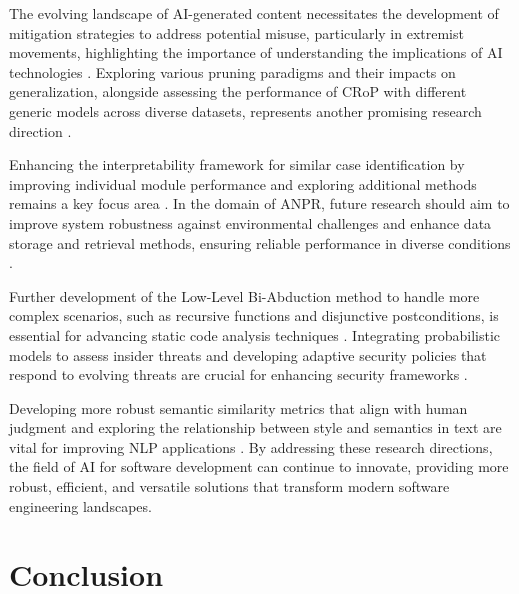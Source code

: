 The evolving landscape of AI-generated content necessitates the development of mitigation strategies to address potential misuse, particularly in extremist movements, highlighting the importance of understanding the implications of AI technologies \cite{mcguffie2020radicalizationrisksgpt3advanced}. Exploring various pruning paradigms and their impacts on generalization, alongside assessing the performance of CRoP with different generic models across diverse datasets, represents another promising research direction \cite{kaur2024cropcontextwiserobuststatic}.



Enhancing the interpretability framework for similar case identification by improving individual module performance and exploring additional methods remains a key focus area \cite{lin2023interpretabilityframeworksimilarcase}. In the domain of ANPR, future research should aim to improve system robustness against environmental challenges and enhance data storage and retrieval methods, ensuring reliable performance in diverse conditions \cite{adak2022automaticnumberplaterecognition}.



Further development of the Low-Level Bi-Abduction method to handle more complex scenarios, such as recursive functions and disjunctive postconditions, is essential for advancing static code analysis techniques \cite{holk2022lowlevelbiabduction}. Integrating probabilistic models to assess insider threats and developing adaptive security policies that respond to evolving threats are crucial for enhancing security frameworks \cite{kammller2020applyingisabelleinsiderframework}.



Developing more robust semantic similarity metrics that align with human judgment and exploring the relationship between style and semantics in text are vital for improving NLP applications \cite{yamshchikov2020styletransferparaphraselookingsensible}. By addressing these research directions, the field of AI for software development can continue to innovate, providing more robust, efficient, and versatile solutions that transform modern software engineering landscapes.











\section{Conclusion} \label{sec:Conclusion}







